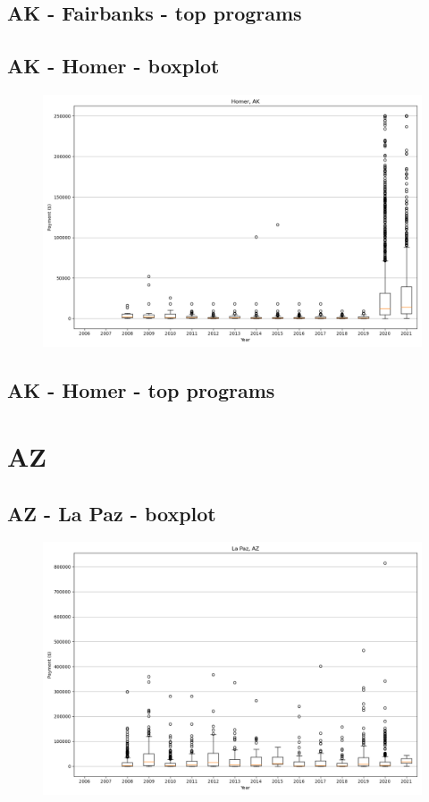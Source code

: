 \subsection*{AK - Fairbanks - top programs}

\newpage
\subsection*{AK - Homer - boxplot}
\begin{figure}[h]
\centering
\includegraphics[width=7in]{../output/boxplots/counties/Homer-AK_boxplot.png}
\end{figure}


\subsection*{AK - Homer - top programs}

\newpage
\section*{AZ}
\subsection*{AZ - La Paz - boxplot}
\begin{figure}[h]
\centering
\includegraphics[width=7in]{../output/boxplots/counties/La Paz-AZ_boxplot.png}
\end{figure}


